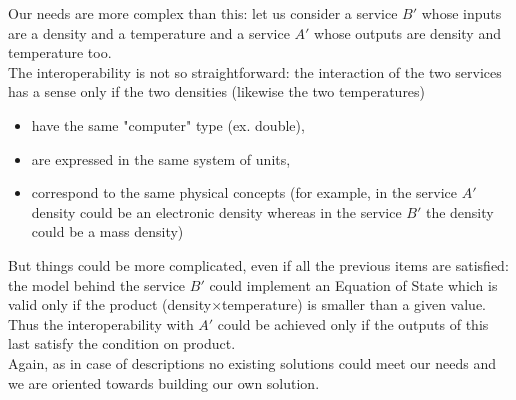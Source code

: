 \documentclass[a4paper,11pt] {ivoa}
\begin{document}
Our needs are more complex than this: let us consider a service $B'$ whose inputs are a density and
a temperature and a service $A'$ whose outputs are density and temperature too. \\
The interoperability is not so straightforward: the interaction of the two services has a sense only
if the two densities (likewise the two temperatures)
\begin{itemize}
\item have the same "computer" type (ex. double),
\item are expressed in the same system of units,
\item correspond to the same physical concepts (for example, in the service $A'$ density could be
an electronic density whereas in the service $B'$ the density could be a mass density)
\end{itemize}
But things could be more complicated, even if all the previous items are satisfied: the model behind
the service $B'$ could implement an Equation of State which is valid only if the product
(density$\times$temperature) is smaller than a given value.
Thus the interoperability with $A'$ could be achieved only if the outputs of this last satisfy the
condition on product.\\

Again, as in case of descriptions no existing solutions could meet our needs and we are oriented
towards building our own solution.
\end{document}
